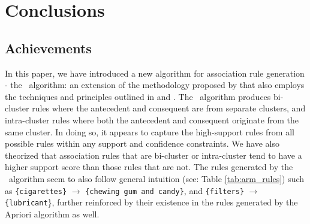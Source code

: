 \chapter{Conclusions}
\section{Achievements}
In this paper, we have introduced a new algorithm for association rule generation - the \algo\ algorithm: an extension of the methodology proposed by  that also employs the techniques and principles outlined in  and . The \algo\ algorithm produces bi-cluster rules where the antecedent and consequent are from separate clusters, and intra-cluster rules where both the antecedent and consequent originate from the same cluster. In doing so, it appears to capture the high-support rules from all possible rules within any support and confidence constraints.  We have also theorized that association rules that are bi-cluster or intra-cluster tend to have a higher support score than those rules that are not. The rules generated by the \algo\ algorithm seem to also follow general intuition (see: Table \ref{tab:arm_rules}) such as \texttt{\{cigarettes\}} $\rightarrow$ \texttt{\{chewing gum and candy\}}, and \texttt{\{filters\}} $\rightarrow$ \texttt{\{lubricant}\}, further reinforced by their existence in the rules generated by the Apriori algorithm as well.

